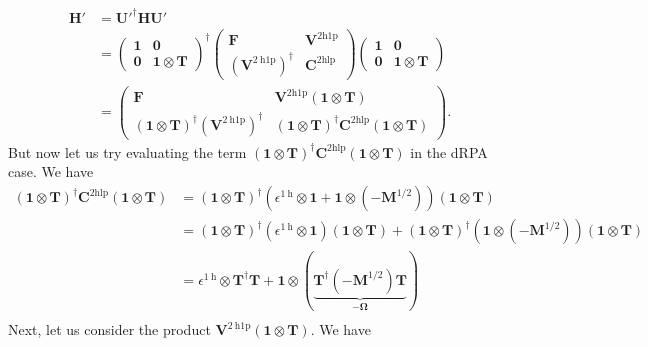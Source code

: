 \begin{align}
    \bm{H'} &= {\bm{U}'}^\dagger \bm{H} \bm{U'} \\
    &= \begin{pmatrix} \bm{1} & \bm{0}\\ \bm{0}&\bm{1}\otimes\bm{T} \end{pmatrix}^\dagger 
       \begin{pmatrix} \bm{F} & \bm{V}^{2 \mathrm{h1p}}\\ 
       \left( \bm{V}^{2 \mathrm{~h} 1 \mathrm{p}} \right)^{\dagger} & 
       \bm{C}^{2 \mathrm{hlp}} \end{pmatrix} 
       \begin{pmatrix} \bm{1} & \bm{0} \\ \bm{0}&\bm{1} \otimes \bm{T} \end{pmatrix} \\
    &= \begin{pmatrix} 
        \bm{F} & \bm{V}^{2 \mathrm{h1p}} \left( \bm{1} \otimes \bm{T} \right) \\
        \left( \bm{1} \otimes \bm{T} \right)^\dagger 
        \left( \bm{V}^{2 \mathrm{~h} 1 \mathrm{p}} \right)^{\dagger} & 
        \left( \bm{1} \otimes \bm{T} \right)^\dagger 
        \bm{C}^{2 \mathrm{hlp}} 
        \left( \bm{1} \otimes \bm{T} \right) 
    \end{pmatrix}.
\label{eq:tim_upfolded_hamiltonian}
\end{align}
But now let us try evaluating the term $\left(\bm{1}\otimes\bm{T}\right)^\dagger \bm{C}^{2 \mathrm{hlp}} \left(\bm{1}\otimes\bm{T}\right)$ in the dRPA case. We have
\begin{align}
    \left(\bm{1}\otimes\bm{T}\right)^\dagger \bm{C}^{2 \mathrm{hlp}} \left(\bm{1}\otimes\bm{T}\right) &= \left(\bm{1}\otimes\bm{T}\right)^\dagger \left(\epsilon^{1 \mathrm{~h}} \otimes \bm{1} + \bm{1} \otimes (-{\bm{M}}^{1/2})\right) \left(\bm{1}\otimes\bm{T}\right) \\
&= \left(\bm{1}\otimes\bm{T}\right)^\dagger \left(\epsilon^{1 \mathrm{~h}} \otimes \bm{1}\right) \left(\bm{1}\otimes\bm{T}\right) + \left(\bm{1}\otimes\bm{T}\right)^\dagger \left(\bm{1} \otimes (-{\bm{M}}^{1/2})\right) \left(\bm{1}\otimes\bm{T}\right) \\
&= \epsilon^{1 \mathrm{~h}} \otimes\bm{T}^\dagger\bm{T} + \bm{1} \otimes \left(\underbrace{\bm{T}^\dagger (-{\bm{M}}^{1/2}) \bm{T}}_{-\boldsymbol{\Omega}}\right) \\
\end{align}
Next, let us consider the product $\bm{V}^{2 \mathrm{~h} 1 \mathrm{p}} \left(\bm{1}\otimes\bm{T}\right) $. We have
